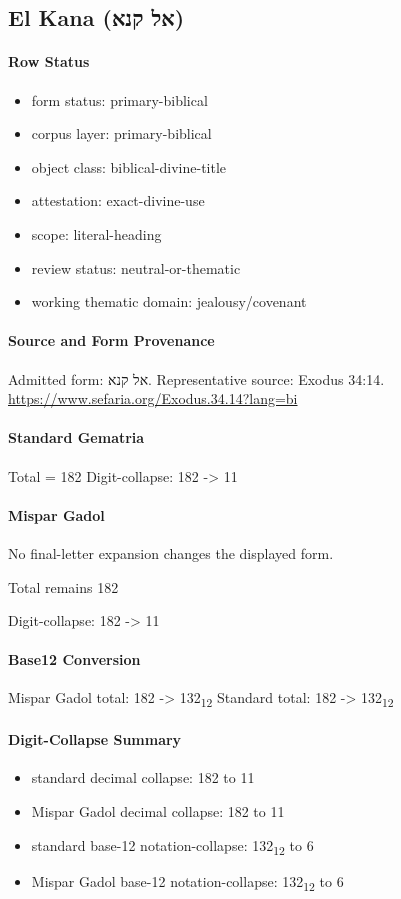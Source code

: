 \subsection{El Kana (אל קנא)}
\paragraph{Row Status}
\begin{itemize}
\item form status: primary-biblical
\item corpus layer: primary-biblical
\item object class: biblical-divine-title
\item attestation: exact-divine-use
\item scope: literal-heading
\item review status: neutral-or-thematic
\item working thematic domain: jealousy/covenant
\end{itemize}
\paragraph{Source and Form Provenance}
Admitted form: אל קנא.
Representative source: Exodus 34:14.
\url{https://www.sefaria.org/Exodus.34.14?lang=bi}
\paragraph{Standard Gematria}
Total = 182
Digit-collapse: 182 -> 11
\paragraph{Mispar Gadol}
No final-letter expansion changes the displayed form.

Total remains 182

Digit-collapse: 182 -> 11
\paragraph{Base12 Conversion}
Mispar Gadol total: 182 -> 132\textsubscript{12}
Standard total: 182 -> 132\textsubscript{12}
\paragraph{Digit-Collapse Summary}
\begin{itemize}
\item standard decimal collapse: 182 to 11
\item Mispar Gadol decimal collapse: 182 to 11
\item standard base-12 notation-collapse: 132\textsubscript{12} to 6
\item Mispar Gadol base-12 notation-collapse: 132\textsubscript{12} to 6
\end{itemize}
